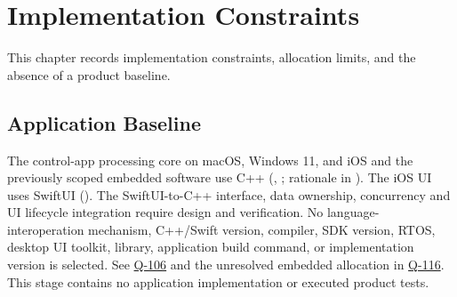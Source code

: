 \chapter{Implementation Constraints}
\label{Section:ImplementationResponsibility}
This chapter records implementation constraints, allocation limits, and the absence of a product baseline.



\section{Application Baseline}
The control-app processing core on macOS, Windows 11, and iOS and the previously scoped embedded software use C++ (, ; rationale in ). The iOS UI uses SwiftUI (). The SwiftUI-to-C++ interface, data ownership, concurrency and UI lifecycle integration require design and verification. No language-interoperation mechanism, C++/Swift version, compiler, SDK version, RTOS, desktop UI toolkit, library, application build command, or implementation version is selected. See \hyperref[Question:Q-106]{Q-106} and the unresolved embedded allocation in \hyperref[Question:Q-116]{Q-116}. This stage contains no application implementation or executed product tests.
